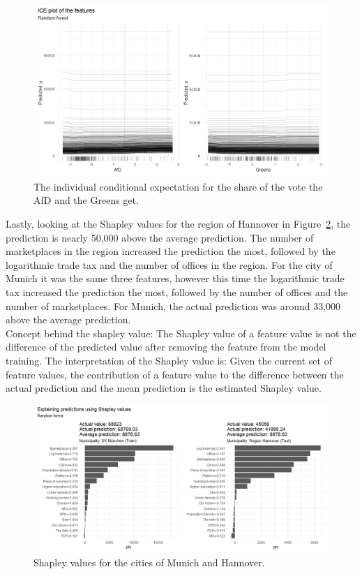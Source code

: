 \begin{figure}[H]
  \centering
  \includegraphics[width = \textwidth]{ice_rf_germany_3.png}
  \caption{The individual conditional expectation for the share of the vote the AfD and the Greens get.}
  \label{ice_rf_germany_3}
\end{figure}
Lastly, looking at the Shapley values for the region of Hannover in Figure~\ref{shapley_rf_germany}, the prediction is nearly 50,000 above the average prediction. The number of marketplaces in the region increased the prediction the most, followed by the logarithmic trade tax and the number of offices in the region. For the city of Munich it was the same three features, however this time the logarithmic trade tax increased the prediction the most, followed by the number of offices and the number of marketplaces. For Munich, the actual prediction was around 33,000 above the average prediction. \\
Concept behind the shapley value: The Shapley value of a feature value is not the difference of the predicted value after removing the feature from the model training. The interpretation of the Shapley value is: Given the current set of feature values, the contribution of a feature value to the difference between the actual prediction and the mean prediction is the estimated Shapley value.
\begin{figure}[H]
  \centering
  \includegraphics[width = \textwidth]{shapley_rf_germany.png}
  \caption{Shapley values for the cities of Munich and Hannover.}
  \label{shapley_rf_germany}
\end{figure}
